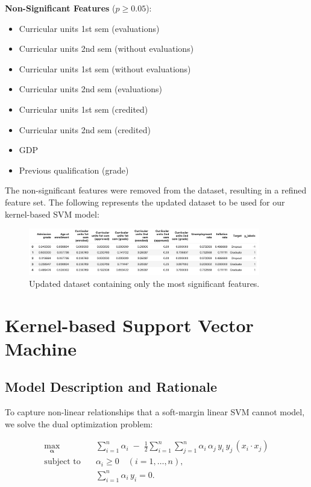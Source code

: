 \documentclass[12pt]{article}
\begin{document}
\textbf{Non-Significant Features} ($p \ge 0.05$):
\begin{itemize}
    \item Curricular units 1st sem (evaluations)
    \item Curricular units 2nd sem (without evaluations)
    \item Curricular units 1st sem (without evaluations)
    \item Curricular units 2nd sem (evaluations)
    \item Curricular units 1st sem (credited)
    \item Curricular units 2nd sem (credited)
    \item GDP
    \item Previous qualification (grade)
\end{itemize}

The non-significant features were removed from the dataset, resulting in a refined feature set. The following represents the updated dataset to be used for our kernel-based SVM model:

\begin{figure}[H]
    \centering
    \includegraphics[width=0.9\textwidth]{./significant-features-dataset.png}
    \caption{Updated dataset containing only the most significant features.}
    \label{fig:sigdata}
\end{figure}


\section{Kernel-based Support Vector Machine} 

\subsection{Model Description and Rationale}

To capture non-linear relationships that a soft-margin linear SVM cannot model, we solve the dual optimization problem:

\[
\begin{aligned}
\max_{\boldsymbol{\alpha}}\quad
&\sum_{i=1}^n \alpha_i
 \;-\;
 \frac{1}{2}\sum_{i=1}^n\sum_{j=1}^n 
 \alpha_i\,\alpha_j\,y_i\,y_j\,(x_i \cdot x_j)
 \\[4pt]
\text{subject to}\quad
&\alpha_i \ge 0 \quad (i=1,\dots,n),\\[4pt]
&\sum_{i=1}^n \alpha_i\,y_i = 0.
\end{aligned}
\]
\end{document}

